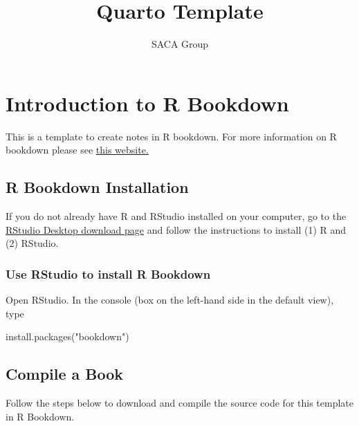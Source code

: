 \documentclass[
  letterpaper,
]{article}
\title{Quarto Template}
\author{SACA Group}
\date{}
\newenvironment{Shaded}{\begin{snugshade}}{\end{snugshade}}
\newcommand{\FunctionTok}[1]{\textcolor[rgb]{0.28,0.35,0.67}{#1}}
\newcommand{\NormalTok}[1]{\textcolor[rgb]{0.00,0.23,0.31}{#1}}
\newcommand{\StringTok}[1]{\textcolor[rgb]{0.13,0.47,0.30}{#1}}
\numberwithin{equation}{section}
\numberwithin{figure}{section}
\theoremstyle{break}
\renewcommand*\contentsname{Table of contents}
\newcommand\contentsname{Table of contents}
\begin{document}
\maketitle

\renewcommand*\contentsname{Table of contents}
{
\hypersetup{linkcolor=}
\setcounter{tocdepth}{2}
\tableofcontents
}
\listoffigures
\listoftables


\section{Introduction to R Bookdown}\label{introduction-to-r-bookdown}

This is a template to create notes in R bookdown. For more information
on R bookdown please see
\href{https://bookdown.org/yihui/bookdown/?target=_blank}{this website.}

\subsection{R Bookdown Installation}\label{r-bookdown-installation}

If you do not already have R and RStudio installed on your computer, go
to the
\href{https://posit.co/download/rstudio-desktop/?target=_blank}{RStudio
Desktop download page} and follow the instructions to install (1) R and
(2) RStudio.

\subsubsection*{Use RStudio to install R
Bookdown}\label{use-rstudio-to-install-r-bookdown}

Open RStudio. In the console (box on the left-hand side in the default
view), type

\begin{Shaded}
\begin{Highlighting}[]
\FunctionTok{install.packages}\NormalTok{(}\StringTok{"bookdown"}\NormalTok{)}
\end{Highlighting}
\end{Shaded}

\subsection{Compile a Book}\label{compile-a-book}

Follow the steps below to download and compile the source code for this
template in R Bookdown.
\end{document}
